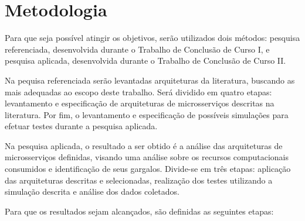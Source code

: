 \section{Metodologia}
\label{met}

Para que seja possível atingir os objetivos, serão utilizados dois métodos: pesquisa referenciada, desenvolvida durante o Trabalho de Conclusão de Curso I, e pesquisa aplicada, desenvolvida durante o Trabalho de Conclusão de Curso II.


Na pequisa referenciada serão levantadas arquiteturas da literatura, buscando as mais adequadas ao escopo deste trabalho.
%
Será dividido em quatro etapas: levantamento e especificação de arquiteturas de microsserviços descritas na literatura.
%
Por fim, o levantamento e especificação de possíveis simulações para efetuar testes durante a pesquisa aplicada.

Na pesquisa aplicada, o resultado a ser obtido é a análise das arquiteturas de microsserviços definidas, visando uma análise sobre os recursos computacionais consumidos e identificação de seus gargalos.
%
Divide-se em três etapas: aplicação das arquiteturas descritas e selecionadas, realização dos testes utilizando a simulação descrita e análise dos dados coletados.

Para que os resultados sejam alcançados, são definidas as seguintes etapas:

